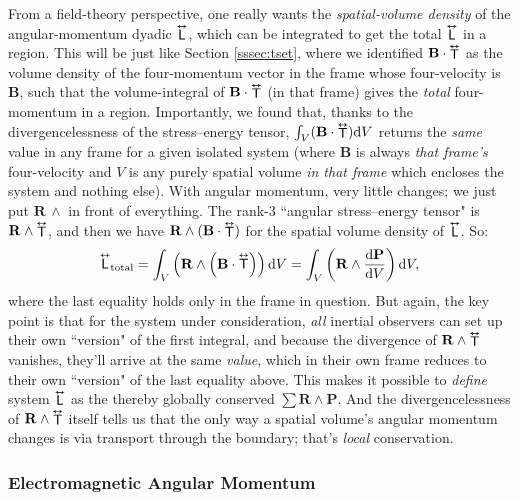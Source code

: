\documentclass[12pt]{article}
\renewcommand{\vv}[1]{\mathbf{#1}}
\newcommand{\dd}[1]{\mathrm{d}#1}
\newcommand{\tightoverset}[2]{%
  \mathop{#2}\limits^{\vbox to -.5ex{\kern-0.75ex\hbox{$#1$}\vss}}}
\newcommand{\inlinedy}[1]{\tightoverset{\text{\tiny$\bm\leftrightarrow$}}{#1}}
\newcommand{\capdy}[1]{ \overset{ \text{\tiny$\bm\leftrightarrow$} }{\vphantom{\text{\small{A}}}\smash{#1}} }
\begin{document}
From a field-theory perspective, one really wants the \emph{spatial-volume density} of the angular-momentum dyadic $\inlinedy{\mathsf{L}}$, which can be integrated to get the total $\inlinedy{\mathsf{L}}$ in a region. This will be just like Section \ref{sssec:tset}, where we identified $\vv B \cdot {\inlinedy{\mathsf{T}}} $ as the volume density of the four-momentum vector in the frame whose four-velocity is $\vv B$, such that the volume-integral of $\vv B \cdot {\inlinedy{\mathsf{T}}} $ (in that frame) gives the \emph{total} four-momentum in a region. Importantly, we found that, thanks to the divergencelessness of the stress--energy tensor, $\int_V (\vv B \cdot {\inlinedy{\mathsf{T}}} ) \dd V$ returns the \emph{same} value in any frame for a given isolated system (where $\vv B$ is always \emph{that frame's} four-velocity and $V$ is any purely spatial volume \emph{in that frame} which encloses the system and nothing else). With angular momentum, very little changes; we just put $\vv R \, \wedge$ in front of everything. The rank-3 ``angular stress--energy tensor" is $\vv R \wedge {\inlinedy{\mathsf{T}}}$, and then we have $\vv R \wedge (\vv B \cdot {\inlinedy{\mathsf{T}}})$ for the spatial volume density of $\inlinedy{\mathsf{L}}$. So:
\begin{equation*}
\capdy{\mathsf{L}}_{\textrm{total}} = \int_V \left( \vv R \wedge \left( \vv B \cdot {\capdy{\mathsf{T}}} \right) \right) \dd V = \int_V \left( \vv R \wedge \dfrac{\dd \vv P}{\dd V} \right) \dd V,
\end{equation*}
where the last equality holds only in the frame in question. But again, the key point is that for the system under consideration, \emph{all} inertial observers can set up their own ``version" of the first integral, and because the divergence of $\vv R \wedge {\inlinedy{\mathsf{T}}}$ vanishes, they'll arrive at the same \emph{value}, which in their own frame reduces to their own ``version" of the last equality above. This makes it possible to \emph{define} system $\inlinedy{\mathsf{L}}$ as the thereby globally conserved $\sum \vv R \wedge \vv P$. And the divergencelessness of $\vv R \wedge {\inlinedy{\mathsf{T}}}$ itself tells us that the only way a spatial volume's angular momentum changes is via transport through the boundary; that's \emph{local} conservation.

\subsubsection{Electromagnetic Angular Momentum}
\end{document}
